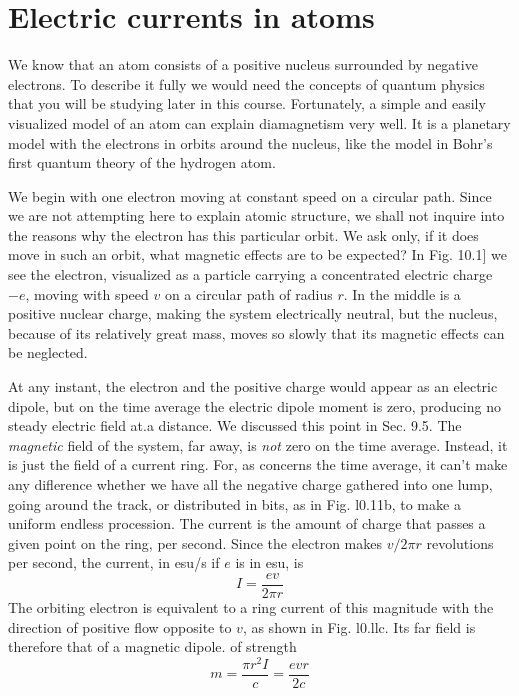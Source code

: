  
\section{Electric currents in atoms}

We know that an atom consists of a positive nucleus surrounded
by negative electrons. To describe it fully we would need the concepts
of quantum physics that you will be studying later in this
course. Fortunately, a simple and easily visualized model of an
atom can explain diamagnetism very well. It is a planetary model
with the electrons in orbits around the nucleus, like the model in
Bohr's first quantum theory of the hydrogen atom.

We begin with one electron moving at constant speed on a circular
path. Since we are not attempting here to explain atomic structure,
we shall not inquire into the reasons why the electron has this particular
orbit. We ask only, if it does move in such an orbit, what
magnetic effects are to be expected? In Fig. 10.1] we see the 
electron, visualized as a particle carrying a concentrated electric charge
$-e$, moving with speed $v$ on a circular path of radius $r$. In the middle
is a positive nuclear charge, making the system electrically neutral,
but the nucleus, because of its relatively great mass, moves so slowly
that its magnetic effects can be neglected.

At any instant, the electron and the positive charge would appear
as an electric dipole, but on the time average the electric dipole
moment is zero, producing no steady electric field at.a distance. We
discussed this point in Sec. 9.5. The \emph{magnetic} field of the system,
far away, is \emph{not} zero on the time average. Instead, it is just the field
of a current ring. For, as concerns the time average, it can't make
any diflerence whether we have all the negative charge gathered into
one lump, going around the track, or distributed in bits, as in
Fig. l0.11b, to make a uniform endless procession. The current is
the amount of charge that passes a given point on the ring, per
second. Since the electron makes $v/2\pi r$ revolutions per second, the
current, in esu/s if $e$ is in esu, is
\begin{equation}
  I = \frac{ev}{2\pi r}
\end{equation}
The orbiting electron is equivalent to a ring current of this magnitude
with the direction of positive flow opposite to $v$, as shown in
Fig. l0.llc. Its far field is therefore that of a magnetic dipole. of
strength
\begin{equation}
  m = \frac{\pi r^2 I}{c} = \frac{evr}{2c}
\end{equation}

